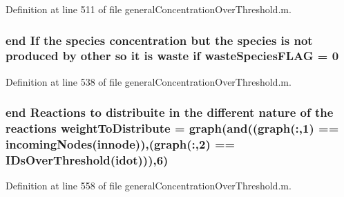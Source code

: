 Definition at line 511 of file general\-Concentration\-Over\-Threshold.\-m.

\hypertarget{a00028_a86a34d23ef767cc82038231f868cea96}{
\subsubsection[{waste\-Species\-F\-L\-A\-G}]{ {\bf end} If the {\bf species} concentration but the {\bf species} is not produced by other so it is waste {\bf if} waste\-Species\-F\-L\-A\-G = 0}}\label{a00028_a86a34d23ef767cc82038231f868cea96}


Definition at line 538 of file general\-Concentration\-Over\-Threshold.\-m.

\hypertarget{a00028_a8f29aae1a516e7b27fa97f490490b59c}{
\subsubsection[{weight\-To\-Distribute}]{ {\bf end} Reactions {\bf to} distribuite in the different nature of the {\bf reactions} weight\-To\-Distribute = {\bf graph}({\bf and}(({\bf graph}(\-:,1) == {\bf incoming\-Nodes}({\bf innode})),({\bf graph}(\-:,2) == {\bf I\-Ds\-Over\-Threshold}(idot))),6)}}\label{a00028_a8f29aae1a516e7b27fa97f490490b59c}


Definition at line 558 of file general\-Concentration\-Over\-Threshold.\-m.

